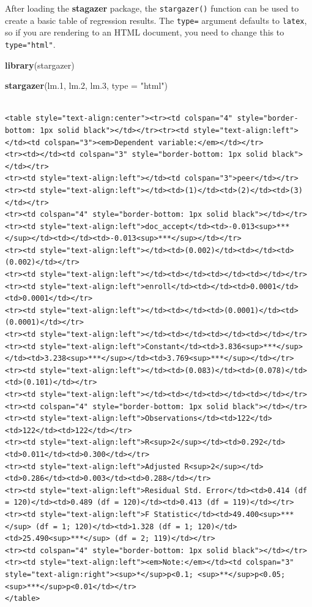 \documentclass[]{book}
\newenvironment{Shaded}{\begin{snugshade}}{\end{snugshade}}
\newcommand{\DataTypeTok}[1]{\textcolor[rgb]{0.13,0.29,0.53}{#1}}
\newcommand{\FloatTok}[1]{\textcolor[rgb]{0.00,0.00,0.81}{#1}}
\newcommand{\KeywordTok}[1]{\textcolor[rgb]{0.13,0.29,0.53}{\textbf{#1}}}
\newcommand{\NormalTok}[1]{#1}
\newcommand{\StringTok}[1]{\textcolor[rgb]{0.31,0.60,0.02}{#1}}
\begin{document}
After loading the \textbf{stagazer} package, the \texttt{stargazer()} function can be used to create a basic table of regression results. The \texttt{type=} argument defaults to \texttt{latex}, so if you are rendering to an HTML document, you need to change this to \texttt{type="html"}.

\begin{Shaded}
\begin{Highlighting}[]
\KeywordTok{library}\NormalTok{(stargazer)}

\KeywordTok{stargazer}\NormalTok{(lm}\FloatTok{.1}\NormalTok{, lm}\FloatTok{.2}\NormalTok{, lm}\FloatTok{.3}\NormalTok{, }\DataTypeTok{type =} \StringTok{"html"}\NormalTok{)}
\end{Highlighting}
\end{Shaded}

\begin{verbatim}

<table style="text-align:center"><tr><td colspan="4" style="border-bottom: 1px solid black"></td></tr><tr><td style="text-align:left"></td><td colspan="3"><em>Dependent variable:</em></td></tr>
<tr><td></td><td colspan="3" style="border-bottom: 1px solid black"></td></tr>
<tr><td style="text-align:left"></td><td colspan="3">peer</td></tr>
<tr><td style="text-align:left"></td><td>(1)</td><td>(2)</td><td>(3)</td></tr>
<tr><td colspan="4" style="border-bottom: 1px solid black"></td></tr><tr><td style="text-align:left">doc_accept</td><td>-0.013<sup>***</sup></td><td></td><td>-0.013<sup>***</sup></td></tr>
<tr><td style="text-align:left"></td><td>(0.002)</td><td></td><td>(0.002)</td></tr>
<tr><td style="text-align:left"></td><td></td><td></td><td></td></tr>
<tr><td style="text-align:left">enroll</td><td></td><td>0.0001</td><td>0.0001</td></tr>
<tr><td style="text-align:left"></td><td></td><td>(0.0001)</td><td>(0.0001)</td></tr>
<tr><td style="text-align:left"></td><td></td><td></td><td></td></tr>
<tr><td style="text-align:left">Constant</td><td>3.836<sup>***</sup></td><td>3.238<sup>***</sup></td><td>3.769<sup>***</sup></td></tr>
<tr><td style="text-align:left"></td><td>(0.083)</td><td>(0.078)</td><td>(0.101)</td></tr>
<tr><td style="text-align:left"></td><td></td><td></td><td></td></tr>
<tr><td colspan="4" style="border-bottom: 1px solid black"></td></tr><tr><td style="text-align:left">Observations</td><td>122</td><td>122</td><td>122</td></tr>
<tr><td style="text-align:left">R<sup>2</sup></td><td>0.292</td><td>0.011</td><td>0.300</td></tr>
<tr><td style="text-align:left">Adjusted R<sup>2</sup></td><td>0.286</td><td>0.003</td><td>0.288</td></tr>
<tr><td style="text-align:left">Residual Std. Error</td><td>0.414 (df = 120)</td><td>0.489 (df = 120)</td><td>0.413 (df = 119)</td></tr>
<tr><td style="text-align:left">F Statistic</td><td>49.400<sup>***</sup> (df = 1; 120)</td><td>1.328 (df = 1; 120)</td><td>25.490<sup>***</sup> (df = 2; 119)</td></tr>
<tr><td colspan="4" style="border-bottom: 1px solid black"></td></tr><tr><td style="text-align:left"><em>Note:</em></td><td colspan="3" style="text-align:right"><sup>*</sup>p<0.1; <sup>**</sup>p<0.05; <sup>***</sup>p<0.01</td></tr>
</table>
\end{verbatim}
\end{document}
